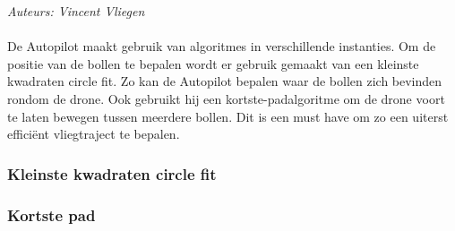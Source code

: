 {\em Auteurs: Vincent  Vliegen}
\\
\\
\noindent
De Autopilot maakt gebruik van algoritmes in verschillende instanties. Om de positie van de bollen te bepalen wordt er gebruik gemaakt van een kleinste kwadraten circle fit. Zo kan de Autopilot bepalen waar de bollen zich bevinden rondom de drone. Ook gebruikt hij een kortste-padalgoritme om de drone voort te laten bewegen tussen meerdere bollen. Dit is een must have om zo een uiterst effici\"ent vliegtraject te bepalen.

\subsubsection{Kleinste kwadraten circle fit}
\label{subsec: Kleinste kwadraten circle fit}


\subsubsection{Kortste pad}
\label{subsec: Kortste pad}
